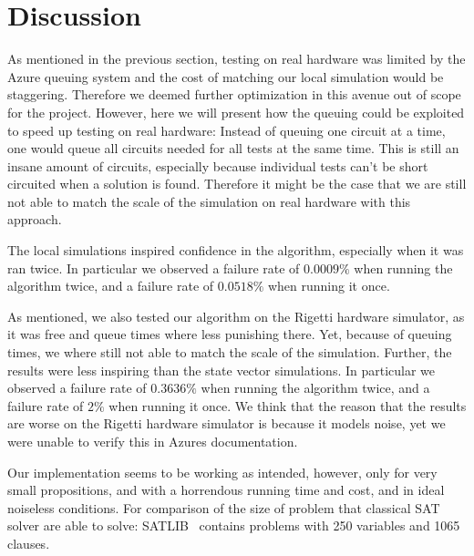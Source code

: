 \section{Discussion}\label{sec:discussion}

As mentioned in the previous section, testing on real hardware was limited by the Azure queuing system and the cost of matching our local simulation would be staggering.
Therefore we deemed further optimization in this avenue out of scope for the project.
However, here we will present how the queuing could be exploited to speed up testing on real hardware: Instead of queuing one circuit at a time, one would queue all circuits needed for all tests at the same time.
This is still an insane amount of circuits, especially because individual tests can't be short circuited when a solution is found.
Therefore it might be the case that we are still not able to match the scale of the simulation on real hardware with this approach.

The local simulations inspired confidence in the algorithm, especially when it was ran twice.
In particular we observed a failure rate of $0.0009\%$ when running the algorithm twice, and a failure rate of $0.0518\%$ when running it once.

As mentioned, we also tested our algorithm on the Rigetti hardware simulator, as it was free and queue times where less punishing there.
Yet, because of queuing times, we where still not able to match the scale of the simulation.
Further, the results were less inspiring than the state vector simulations.
In particular we observed a failure rate of $0.3636\%$ when running the algorithm twice, and a failure rate of $2\%$ when running it once.
We think that the reason that the results are worse on the Rigetti hardware simulator is because it models noise, yet we were unable to verify this in Azures documentation.

Our implementation seems to be working as intended, however, only for very small propositions, and with a horrendous running time and cost, and in ideal noiseless conditions.
For comparison of the size of problem that classical SAT solver are able to solve: SATLIB~\cite{hoos2000satlib} contains problems with 250 variables and 1065 clauses.
